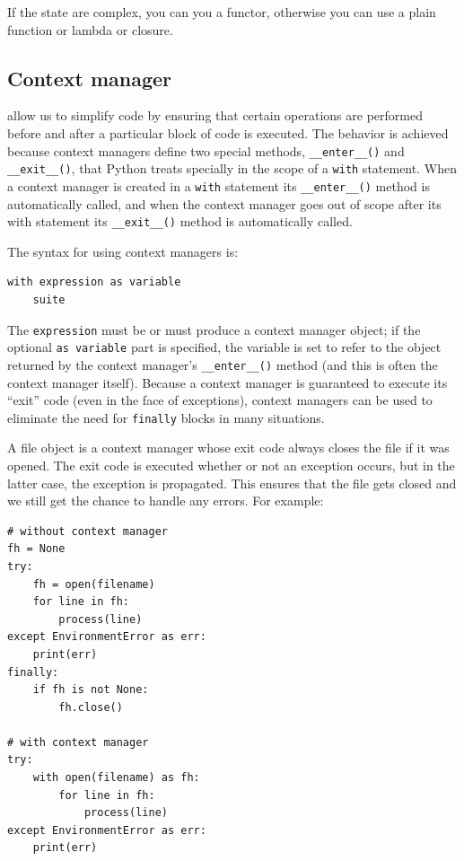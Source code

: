 \begin{tcolorbox}
  If the state are complex, you can you a functor, otherwise you can use a plain function or lambda or closure.
\end{tcolorbox}

\subsection{Context manager}

 allow us to simplify code by ensuring that certain operations are performed before and after a particular block of code is executed.
The behavior is achieved because context managers define two special methods, \verb|__enter__()| and \verb|__exit__()|, that Python treats specially in the scope of a \verb|with| statement.
When a context manager is created in a \verb|with| statement its \verb|__enter__()| method is automatically called, and
when the context manager goes out of scope after its with statement its \verb|__exit__()| method is automatically called.


The syntax for using context managers is:
\begin{tcolorbox}
\begin{verbatim}
with expression as variable
    suite
\end{verbatim}
\end{tcolorbox}

The \verb|expression| must be or must produce a context manager object;
if the optional \verb|as variable| part is specified, the variable is set to refer to the object returned by the context manager’s \verb|__enter__()| method (and this is often the context manager itself).
Because a context manager is guaranteed to execute its ``exit'' code (even in the face of exceptions), context managers can be used to eliminate the need for \verb|finally| blocks in many situations.


A file object is a context manager whose exit code always closes the file if it was opened.
The exit code is executed whether or not an exception occurs, but in the latter case, the exception is propagated.
This ensures that the file gets closed and we still get the chance to handle any errors.
For example:
\begin{lstlisting}
# without context manager
fh = None
try:
    fh = open(filename)
    for line in fh:
        process(line)
except EnvironmentError as err:
    print(err)
finally:
    if fh is not None:
        fh.close()

# with context manager
try:
    with open(filename) as fh:
        for line in fh:
            process(line)
except EnvironmentError as err:
    print(err)  
\end{lstlisting}

